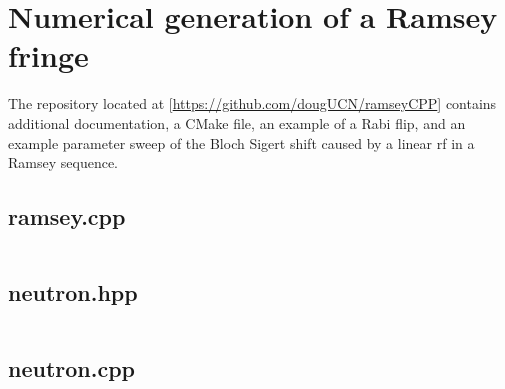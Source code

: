 
\chapter{Numerical generation of a Ramsey fringe}\label{appx:ramsey_numerical}


The repository located at [\url{https://github.com/dougUCN/ramseyCPP}] contains additional documentation, a CMake file, an example of a Rabi flip, and an example parameter sweep of the Bloch Sigert shift caused by a linear \acrshort*{rf} in a Ramsey sequence. 


\cite{numerical_recipes}


\section{ramsey.cpp}

\inputminted{cpp}{code_snippets/ramsey.cpp}

\section{neutron.hpp}

\inputminted{cpp}{code_snippets/neutron.hpp}

\section{neutron.cpp}

\inputminted{cpp}{code_snippets/neutron.cpp}